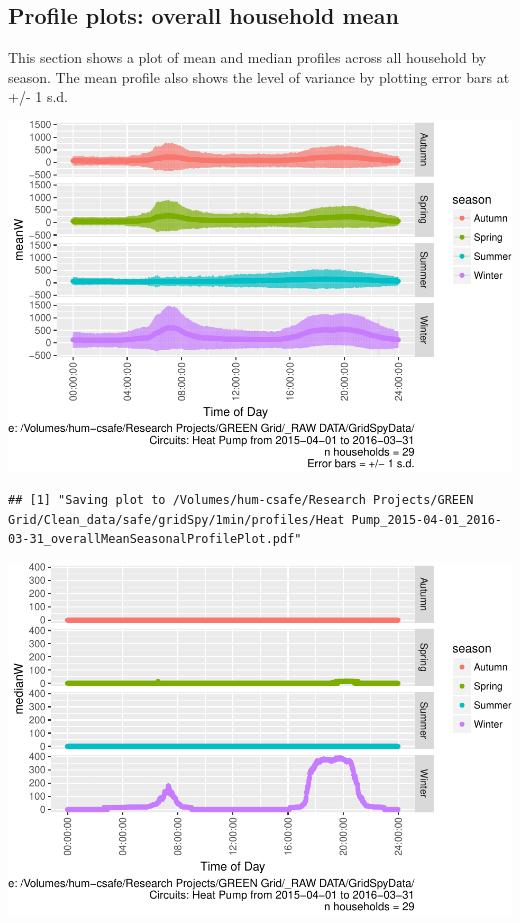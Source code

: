 \documentclass[]{article}
\begin{document}
\subsection{Profile plots: overall household
mean}\label{profile-plots-overall-household-mean}

This section shows a plot of mean and median profiles across all
household by season. The mean profile also shows the level of variance
by plotting error bars at +/- 1 s.d.

\includegraphics{nzGGHouseholdPowerDemandProfile_Heat Pump_2015-04-01_2016-03-31_files/figure-latex/overall profiles by season-1.pdf}

\begin{verbatim}
## [1] "Saving plot to /Volumes/hum-csafe/Research Projects/GREEN Grid/Clean_data/safe/gridSpy/1min/profiles/Heat Pump_2015-04-01_2016-03-31_overallMeanSeasonalProfilePlot.pdf"
\end{verbatim}

\includegraphics{nzGGHouseholdPowerDemandProfile_Heat Pump_2015-04-01_2016-03-31_files/figure-latex/overall profiles by season-2.pdf}
\end{document}
